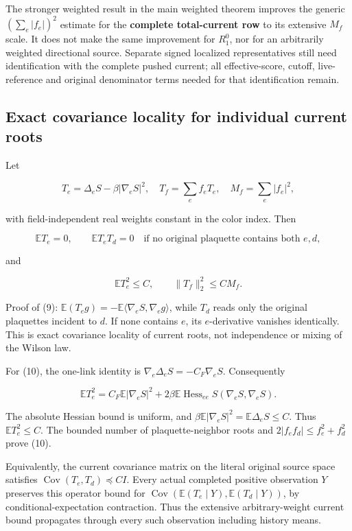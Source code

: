 \documentclass[
  11pt,
]{article}
\begin{document}
The stronger weighted result in the main weighted theorem improves the
generic \((\sum_e|f_e|)^2\) estimate for the \textbf{complete
total-current row} to its extensive \(M_f\) scale. It does not make the
same improvement for \(R_1^0\), nor for an arbitrarily weighted
directional source. Separate signed localized representatives still need
identification with the complete pushed current; all effective-score,
cutoff, live-reference and original denominator terms needed for that
identification remain.

\hypertarget{exact-covariance-locality-for-individual-current-roots}{%
\subsection{Exact covariance locality for individual current
roots}\label{exact-covariance-locality-for-individual-current-roots}}

Let

\[
 T_e=\Delta_eS-\beta|\nabla_eS|^2,
 \quad T_f=\sum_e f_eT_e,
 \quad M_f=\sum_e|f_e|^2,
\]

with field-independent real weights constant in the color index. Then

\[
 \mathbb ET_e=0,
 \qquad \mathbb E T_eT_d=0
 \quad\text{if no original plaquette contains both }e,d, \tag{9}
\]

and

\[
 \mathbb ET_e^2\le C,
 \qquad \|T_f\|_2^2\le C M_f. \tag{10}
\]

Proof of (9):
\(\mathbb E(T_eg)=-\mathbb E\langle\nabla_eS,\nabla_eg\rangle\), while
\(T_d\) reads only the original plaquettes incident to \(d\). If none
contains \(e\), its \(e\)-derivative vanishes identically. This is exact
covariance locality of current roots, not independence or mixing of the
Wilson law.

For (10), the one-link identity is \(\nabla_e\Delta_eS=-C_F\nabla_eS\).
Consequently

\[
 \mathbb ET_e^2
 =C_F\mathbb E|\nabla_eS|^2
 +2\beta\mathbb E\operatorname{Hess}_{ee}S(\nabla_eS,\nabla_eS).
\]

The absolute Hessian bound is uniform, and
\(\beta\mathbb E|\nabla_eS|^2=\mathbb E\Delta_eS\le C\). Thus
\(\mathbb ET_e^2\le C\). The bounded number of plaquette-neighbor roots
and \(2|f_ef_d|\le f_e^2+f_d^2\) prove (10).

Equivalently, the current covariance matrix on the literal original
source space satisfies \(\operatorname{Cov}(T_e,T_d)\preceq CI\). Every
actual completed positive observation \(Y\) preserves this operator
bound for
\(\operatorname{Cov}(\mathbb E(T_e\mid Y),\mathbb E(T_d\mid Y))\), by
conditional-expectation contraction. Thus the extensive arbitrary-weight
current bound propagates through every such observation including
history means.
\end{document}
